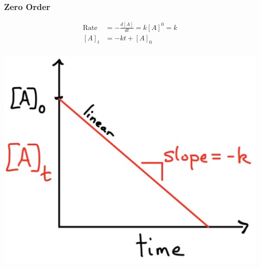     \subsubsection{Zero Order}
        \begin{minipage}{0.99\linewidth}
            \begin{minipage}{0.65\linewidth}
                \begin{align*}
                    \text{Rate} &= -\frac{d[A]}{d t} = k[A]^0 = k \\
                    [A]_t &= -k t + [A]_0 \\
                \end{align*}
            \end{minipage}
            \begin{minipage}{0.34\linewidth}
                \includegraphics[width=0.9\linewidth]{src/7_Kinetics/images/zero_order.pdf}
            \end{minipage}
        \end{minipage}
        


